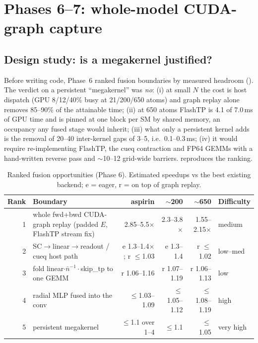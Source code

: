 \section{Phases 6--7: whole-model CUDA-graph capture}
\label{sec:cudagraph}

\subsection{Design study: is a megakernel justified?}
Before writing code, Phase~6 ranked fusion boundaries by measured headroom (). The verdict on a persistent ``megakernel'' was \emph{no}: (i) at small $N$ the cost is host dispatch (GPU 8/12/40\% busy at 21/200/650 atoms) and graph replay alone removes 85--90\% of the attainable time; (ii) at 650 atoms FlashTP is 4.1 of 7.0\,ms of GPU time and is pinned at one block per SM by shared memory, an occupancy any fused stage would inherit; (iii) what only a persistent kernel adds is the removal of 20--40 inter-kernel gaps of 3--5\us, i.e.\ 0.1--0.3\,ms; (iv) it would require re-implementing FlashTP, the cueq contraction and FP64 GEMMs with a hand-written reverse pass and $\sim$10--12 grid-wide barriers.  reproduces the ranking.

\begin{table}[h]
\centering
\caption{Ranked fusion opportunities (Phase 6). Estimated speedups vs the best existing backend; e = eager, r = on top of graph replay.}
\label{tab:rank6}
\small
\begin{tabularx}{\textwidth}{rXrrrl}
\toprule
Rank & Boundary & aspirin & $\sim$200 & $\sim$650 & Difficulty \\
\midrule
1 & whole fwd+bwd CUDA-graph replay (padded $E$, FlashTP stream fix) & 2.85--5.5$\times$ & 2.3--3.8$\times$ & 1.55--2.15$\times$ & medium \\
2 & SC$\to$linear$\to$readout / cueq host path & e 1.3--1.4$\times$; r $\le$1.03 & e 1.3--1.4 & r $\le$1.02 & low--med \\
3 & fold linear$\cdot\bar n^{-1}\cdot$skip\_tp to one GEMM & r 1.06--1.16 & r 1.07--1.19 & r 1.06--1.13 & low \\
4 & radial MLP fused into the conv & $\le$1.03--1.09 & $\le$1.05--1.12 & $\le$1.08--1.19 & high \\
5 & persistent megakernel & $\le$1.1 over 1--4 & $\le$1.1 & $\le$1.05 & very high \\
\bottomrule
\end{tabularx}
\end{table}

